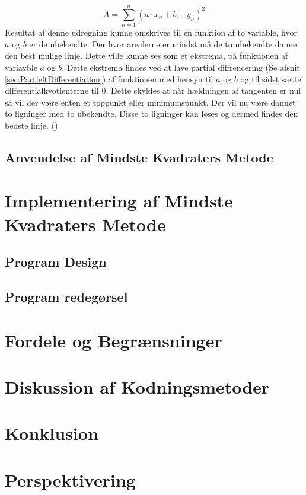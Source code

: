 \begin{equation}A = \sum_{n=1}^n (a \cdot x_n + b - y_n)^2\end{equation}
Resultat af denne udregning kunne omskrives til en funktion af to variable, hvor $a$ og $b$ er de ubekendte. Der hvor arealerne er mindst må de to ubekendte danne den best mulige linje. Dette ville kunne ses som et ekstrema, på funktionen af variavble $a$ og $b$. Dette ekstrema findes ved at lave partial diffrencering (Se afsnit \ref{sec:PartieltDifferentiation}) af funktionen med hensyn til $a$ og $b$ og til sidst sætte differentialkvotienterne til 0. Dette skyldes at når hældningen af tangenten er nul så vil der være enten et toppunkt eller minimumspunkt. Der vil nu være dannet to ligninger med to ubekendte. Disse to ligninger kan løses og dermed findes den bedste linje. (\cite{webmatematikMindsteKvadratersMetode})


\subsection{Anvendelse af Mindste Kvadraters Metode}\label{sec:udregning}


\section{Implementering af Mindste Kvadraters Metode}


\subsection{Program Design}

\subsection{Program redegørsel}

\section{Fordele og Begrænsninger}

\section{Diskussion af Kodningsmetoder}

\section{Konklusion}

\section{Perspektivering}
